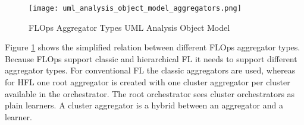 \begin{figure}[h]
    \centering
    \texttt{[image: uml\_analysis\_object\_model\_aggregators.png]}
    \caption{FLOps Aggregator Types UML Analysis Object Model}
    \label{fig:uml_project_aggregators_analysis_object_model}
\end{figure}

Figure \ref{fig:uml_project_aggregators_analysis_object_model} shows the simplified relation between different FLOps aggregator types.
Because FLOps support classic and hierarchical FL it needs to support different aggregator types.
For conventional FL the classic aggregators are used, whereas for HFL one root aggregator is created with one cluster aggregator per cluster available in the orchestrator.
The root orchestrator sees cluster orchestrators as plain learners.
A cluster aggregator is a hybrid between an aggregator and a learner.